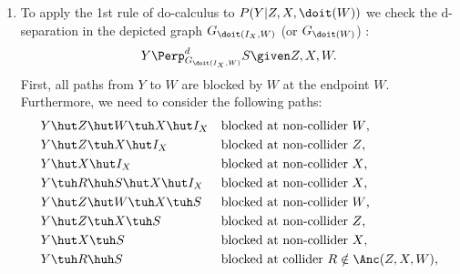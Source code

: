 {\begin{enumerate}
         \begin{align*}
             &Y \hut Z \hut W \tuh X \hut I_X && \text{blocked at non-collider $W$,}\\
             &Y \hut Z \tuh X \hut I_X && \text{blocked at non-collider $Z$,}\\
             &Y \hut X \hut I_X && \text{blocked at non-collider $X$,}\\
             &Y \tuh R \huh S \hut X \hut I_X && \text{blocked at non-collider $X$,}
         \end{align*}
         The 2nd rule of do-calculus then shows the equation:
         \begin{align*}
             P(Y|Z,\doit(X,W)) & = P(Y|Z,X,\doit(W)).
         \end{align*}
     \item To apply the 1st rule of do-calculus to $P(Y|Z,X,\doit(W))$ we check the d-separation in the depicted graph $G_{\doit(I_X,W)}$ (or $G_{\doit(W)}$) : 
         \begin{align*}
             Y \Perp^d_{G_{\doit(I_X,W)}} S \given Z,X,W.
         \end{align*}
        First, all paths from $Y$ to $W$ are blocked by $W$ at the endpoint $W$.
         Furthermore, we need to consider the following paths:
         \begin{align*}
             &Y \hut Z \hut W \tuh X \hut I_X && \text{blocked at non-collider $W$,}\\
             &Y \hut Z \tuh X \hut I_X && \text{blocked at non-collider $Z$,}\\
             &Y \hut X \hut I_X && \text{blocked at non-collider $X$,}\\
             &Y \tuh R \huh S \hut X \hut I_X && \text{blocked at non-collider $X$,}\\
             &Y \hut Z \hut W \tuh X \tuh S && \text{blocked at non-collider $W$,}\\
             &Y \hut Z \tuh X \tuh S && \text{blocked at non-collider $Z$,}\\
             &Y \hut X \tuh S && \text{blocked at non-collider $X$,}\\
             &Y \tuh R \huh S && \text{blocked at collider $R \notin \Anc(Z,X,W)$,}
         \end{align*}

\end{enumerate}}
